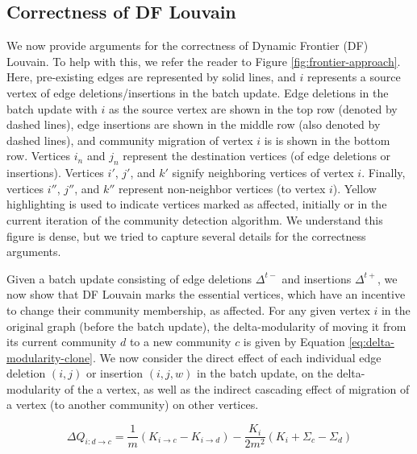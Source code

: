 





\subsection{Correctness of DF Louvain}
\label{sec:louvain-correctness}

We now provide arguments for the correctness of Dynamic Frontier (DF) Louvain. To help with this, we refer the reader to Figure \ref{fig:frontier-approach}. Here, pre-existing edges are represented by solid lines, and $i$ represents a source vertex of edge deletions/insertions in the batch update. Edge deletions in the batch update with $i$ as the source vertex are shown in the top row (denoted by dashed lines), edge insertions are shown in the middle row (also denoted by dashed lines), and community migration of vertex $i$ is is shown in the bottom row. Vertices $i_n$ and $j_n$ represent the destination vertices (of edge deletions or insertions). Vertices $i'$, $j'$, and $k'$ signify neighboring vertices of vertex $i$. Finally, vertices $i''$, $j''$, and $k''$ represent non-neighbor vertices (to vertex $i$). Yellow highlighting is used to indicate vertices marked as affected, initially or in the current iteration of the community detection algorithm. We understand this figure is dense, but we tried to capture several details for the correctness arguments.

Given a batch update consisting of edge deletions $\Delta^{t-}$ and insertions $\Delta^{t+}$, we now show that DF Louvain marks the essential vertices, which have an incentive to change their community membership, as affected. For any given vertex $i$ in the original graph (before the batch update), the delta-modularity of moving it from its current community $d$ to a new community $c$ is given by Equation \ref{eq:delta-modularity-clone}. We now consider the direct effect of each individual edge deletion $(i, j)$ or insertion $(i, j, w)$ in the batch update, on the delta-modularity of the a vertex, as well as the indirect cascading effect of migration of a vertex (to another community) on other vertices.

\begin{equation}
\label{eq:delta-modularity-clone}
  \Delta Q_{i: d \rightarrow c}
  = \frac{1}{m} (K_{i \rightarrow c} - K_{i \rightarrow d}) - \frac{K_i}{2m^2} (K_i + \Sigma_c - \Sigma_d)
\end{equation}

